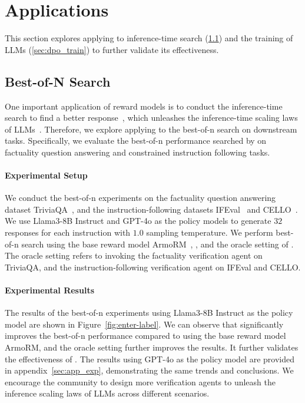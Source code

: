 \section{Applications}
This section explores applying \ourmethod to inference-time search (\cref{sec:best_of_n}) and the training of LLMs (\cref{sec:dpo_train}) to further validate its effectiveness.


\subsection{Best-of-N Search}
\label{sec:best_of_n}

One important application of reward models is to conduct the inference-time search to find a better response~\citep{brown2024large,zhang2024generative}, which unleashes the inference-time scaling laws of LLMs~\citep{snell2024scaling, wu2024inference}. 
Therefore, we explore applying \ourmethod to the best-of-n search on downstream tasks. Specifically, we evaluate the best-of-n performance searched by \ourmethod on factuality question answering and constrained instruction following tasks.

\paragraph{Experimental Setup}
We conduct the best-of-n experiments on the factuality question answering dataset TriviaQA~\citep{joshi2017triviaqa}, and the instruction-following datasets IFEval~\citep{zhou2023instruction} and CELLO~\citep{he2024can}. We use Llama3-8B Instruct and GPT-4o as the policy models to generate $32$ responses for each instruction with $1.0$ sampling temperature. We perform best-of-n search using the base reward model ArmoRM~\citep{wang2024interpretable}, \ourmethodmini, and the oracle setting of \ourmethodmini.  The oracle setting refers to invoking the factuality verification agent on TriviaQA, and the instruction-following verification agent on IFEval and CELLO.



\paragraph{Experimental Results}
The results of the best-of-n experiments using Llama3-8B Instruct as the policy model are shown in Figure~\ref{fig:enter-label}. We can observe that \ourmethod significantly improves the best-of-n performance compared to using the base reward model ArmoRM, and the oracle setting further improves the results. 
It further validates the effectiveness of \ourmethod. 
The results using GPT-4o as the policy model are provided in appendix~\ref{sec:app_exp}, demonstrating the same trends and conclusions. We encourage the community to design more verification agents to unleash the inference scaling laws of LLMs across different scenarios.





